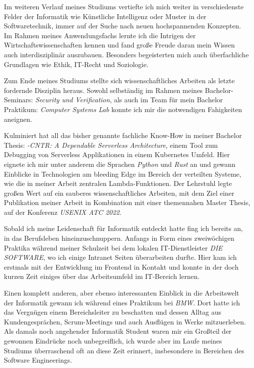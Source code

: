 \documentclass[11pt, a4paper]{awesome-cv}
\begin{document}
\begin{cvletter}
  Im weiteren Verlauf meines Studiums vertiefte ich mich weiter in verschiedenste Felder der Informatik wie Künstliche Intelligenz oder Muster in der Softwaretechnik, immer auf der Suche nach neuen hochspannenden Konzepten. Im Rahmen meines Anwendungsfachs lernte ich die Intrigen der Wirtschaftswissenschaften kennen und fand große Freude daran mein Wissen auch interdisziplinär auszubauen. Besonders begeisterten mich auch überfachliche Grundlagen wie Ethik, IT-Recht und Soziologie.


  Zum Ende meines Studiums stellte sich wissenschaftliches Arbeiten als letzte fordernde Disziplin heraus. Sowohl selbständig im Rahmen meines Bachelor-Seminars: \textit{Security und Verification}, als auch im Team für mein Bachelor Praktikum: \textit{Computer Systems Lab} konnte ich mir die notwendigen Fahigkeiten aneignen.


  Kulminiert hat all das bisher genannte fachliche Know-How in meiner Bachelor Thesis:  \textit{\lambda-CNTR: A Dependable Serverless Architecture}, einem Tool zum Debugging von Serverless Applikationen in einem Kubernetes Umfeld. Hier eignete ich mir unter anderem die Sprachen \textit{Python} und \textit{Rust} an und gewann Einblicke in Technologien am bleeding Edge im Bereich der verteilten Systeme, wie die in meiner Arbeit zentralen Lambda-Funktionen.
  Der Lehrstuhl legte großen Wert auf ein sauberes wissenschaftliches Arbeiten, mit dem Ziel einer Publikation meiner Arbeit in Kombination mit einer themennahen Master Thesis, auf der Konferenz \textit{USENIX ATC 2022}.


  Sobald ich meine Leidenschaft für Informatik entdeckt hatte fing ich bereits an, in das Berufsleben hineinzuschnuppern. Anfangs in Form eines zweiwöchigen Praktika während meiner Schulzeit bei dem lokalen IT-Dienstleister \textit{DIE SOFTWARE}, wo ich einige Intranet Seiten überarbeiten durfte. Hier kam ich erstmals mit der Entwicklung im Frontend in Kontakt und konnte in der doch kurzen Zeit einiges über das Arbeitsumfeld im IT-Bereich lernen.

  Einen komplett anderen, aber ebenso interessanten Einblick in die Arbeitswelt der Informatik gewann ich während eines Praktikum bei \textit{BMW}. Dort hatte ich das Vergnügen einem Bereichsleiter zu beschatten und dessen Alltag aus Kundengesprächen, Scrum-Meetings und auch Ausflügen in Werke mitzuerleben. Als damals noch angehender Informatik Student waren mir ein Großteil der gewonnen Eindrücke noch unbegreiflich, ich wurde aber im Laufe meines Studiums überraschend oft an diese Zeit erinnert, insbesondere in Bereichen des Software Engineerings.


\end{cvletter}
\end{document}
